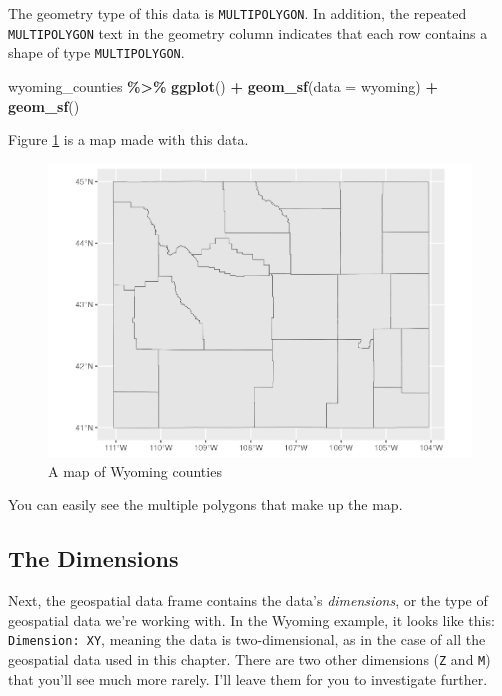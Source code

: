 \documentclass[
]{book}
\newenvironment{Shaded}{\begin{snugshade}}{\end{snugshade}}
\newcommand{\AttributeTok}[1]{\textcolor[rgb]{0.13,0.29,0.53}{#1}}
\newcommand{\FunctionTok}[1]{\textcolor[rgb]{0.13,0.29,0.53}{\textbf{#1}}}
\newcommand{\NormalTok}[1]{#1}
\newcommand{\SpecialCharTok}[1]{\textcolor[rgb]{0.81,0.36,0.00}{\textbf{#1}}}
\begin{document}
The geometry type of this data is \texttt{MULTIPOLYGON}. In addition, the repeated \texttt{MULTIPOLYGON} text in the geometry column indicates that each row contains a shape of type \texttt{MULTIPOLYGON}.

\begin{Shaded}
\begin{Highlighting}[]
\NormalTok{wyoming\_counties }\SpecialCharTok{\%\textgreater{}\%}
  \FunctionTok{ggplot}\NormalTok{() }\SpecialCharTok{+}
  \FunctionTok{geom\_sf}\NormalTok{(}\AttributeTok{data =}\NormalTok{ wyoming) }\SpecialCharTok{+}
  \FunctionTok{geom\_sf}\NormalTok{()}
\end{Highlighting}
\end{Shaded}

Figure \ref{fig:wyoming-counties-map} is a map made with this data.

\begin{figure}
\includegraphics[width=1\linewidth]{maps_files/figure-latex/wyoming-counties-map-1} \caption{A map of Wyoming counties}\label{fig:wyoming-counties-map}
\end{figure}

You can easily see the multiple polygons that make up the map.

\hypertarget{the-dimensions}{%
\subsection*{The Dimensions}\label{the-dimensions}}

Next, the geospatial data frame contains the data's \emph{dimensions}, or the type of geospatial data we're working with. In the Wyoming example, it looks like this: \texttt{Dimension:\ XY}, meaning the data is two-dimensional, as in the case of all the geospatial data used in this chapter. There are two other dimensions (\texttt{Z} and \texttt{M}) that you'll see much more rarely. I'll leave them for you to investigate further.
\end{document}
